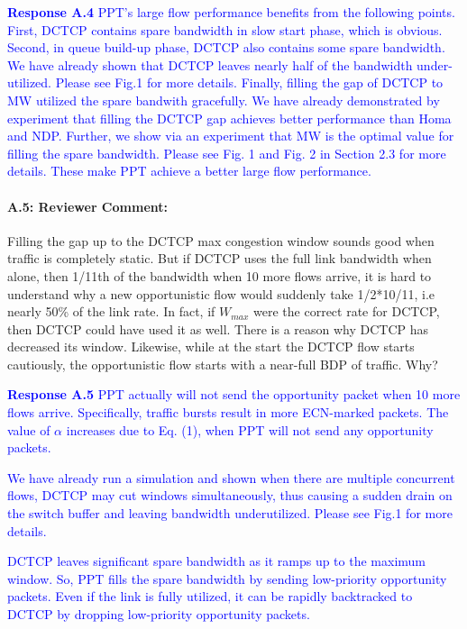 \documentclass[12pt,one-column]{article}
\begin{document}
\noindent\textcolor{blue}{\textbf{Response A.4}
PPT's large flow performance benefits from the following points. 
First, DCTCP contains spare bandwidth in slow start phase, which is obvious.
Second, in queue build-up phase, DCTCP also contains some spare bandwidth. We have already shown that DCTCP leaves nearly half of the bandwidth under-utilized. Please see Fig.1 for more details.
Finally, filling the gap of DCTCP to MW utilized the spare bandwith gracefully. We have already demonstrated by experiment that filling the DCTCP gap achieves better performance than Homa and NDP.
Further, we show via an experiment that MW is the optimal value for filling the spare bandwidth.
Please see Fig. 1 and Fig. 2 in Section 2.3 for more details.
These make PPT achieve a better large flow performance.
} 

{\it \paragraph{A.5: Reviewer Comment:}Filling the gap up to the DCTCP max congestion window sounds good when traffic is completely static. But if DCTCP uses the full link bandwidth when alone, then 1/11th of the bandwidth when 10 more flows arrive, it is hard to understand why a new opportunistic flow would suddenly take 1/2*10/11, i.e nearly 50\% of the link rate. In fact, if $W_{max}$ were the correct rate for DCTCP, then DCTCP could have used it as well. There is a reason why DCTCP has decreased its window. Likewise, while at the start the DCTCP flow starts cautiously, the opportunistic flow starts with a near-full BDP of traffic. Why?}

\noindent\textcolor{blue}{\textbf{Response A.5}
PPT actually will not send the opportunity packet when 10 more flows arrive.
Specifically, traffic bursts result in more ECN-marked packets.
The value of $\alpha$ increases due to Eq. (1), when PPT will not send any opportunity packets.
} 

\textcolor{blue}{We have already run a simulation and shown when there are multiple concurrent flows, DCTCP may cut windows simultaneously, thus causing a sudden drain on the switch buffer and leaving bandwidth underutilized. Please see Fig.1 for more details.}

\textcolor{blue}{DCTCP leaves significant spare bandwidth as it ramps up to the maximum window. So, PPT fills the spare bandwidth by sending low-priority opportunity packets. Even if the link is fully utilized, it can be rapidly backtracked to DCTCP by dropping low-priority opportunity packets.}
\end{document}
